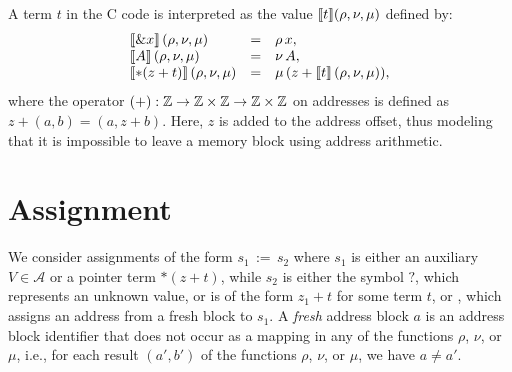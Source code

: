 A term $t$ in the C code is interpreted as the value $\llbracket t\rrbracket(\rho, \nu, \mu)$ defined by:
\[
    \begin{array}{lll}
        \llbracket\& x\rrbracket\,(\rho,\nu,\mu)   & = & \rho\,x,                          \\
        \llbracket A\rrbracket\,(\rho,\nu,\mu)      & = & \nu\,A,                           \\
        \llbracket*(z+t)\rrbracket\,(\rho,\nu,\mu) & = & \mu\,(z+\llbracket t\rrbracket\,(\rho,\nu,\mu)), \\
    \end{array}
\]
where the operator $(+) : \mathbb{Z} \rightarrow \mathbb{Z} \times \mathbb{Z} \rightarrow \mathbb{Z} \times \mathbb{Z}$ on addresses is defined as $z + (a,b) = (a, z+b)$.
Here, $z$ is added to the address offset, thus modeling that it is impossible to leave a memory block using address arithmetic.

\section{Assignment}

We consider assignments of the form $s_1\,{:=}\,s_2$ where $s_1$ is either an auxiliary $V \in \mathcal{A}$ or a pointer term $*(z+t)$, while $s_2$ is either the symbol $?$, which represents an unknown value, or is of the form $z_1 + t$ for some term $t$, or \malloc, which assigns an address from a fresh block to $s_1$.
A \emph{fresh} address block $a$ is an address block identifier that does not occur as a mapping in any of the functions $\rho$, $\nu$, or $\mu$, i.e., for each result $(a',b')$ of the functions $\rho$, $\nu$, or $\mu$, we have $a \neq a'$.

